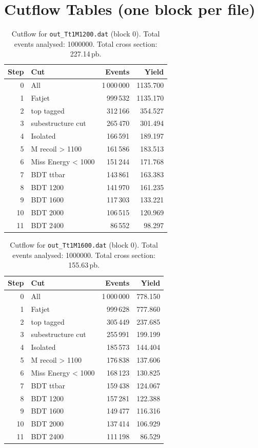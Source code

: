 \documentclass{article}
\begin{document}
\section*{Cutflow Tables (one block per file)}
\begin{table}[H]
\centering
\begin{tabular}{r l r r}
\toprule
Step & Cut & Events & Yield \\
\midrule
0 & All & 1\,000\,000 & 1135.700 \\
1 & Fatjet & 999\,532 & 1135.170 \\
2 & top tagged & 312\,166 & 354.527 \\
3 & subestructure cut & 265\,470 & 301.494 \\
4 & Isolated & 166\,591 & 189.197 \\
5 & M recoil > 1100 & 161\,586 & 183.513 \\
6 & Miss Energy < 1000 & 151\,244 & 171.768 \\
7 & BDT ttbar & 143\,861 & 163.383 \\
8 & BDT 1200 & 141\,970 & 161.235 \\
9 & BDT 1600 & 117\,303 & 133.221 \\
10 & BDT 2000 & 106\,515 & 120.969 \\
11 & BDT 2400 & 86\,552 & 98.297 \\
\bottomrule
\end{tabular}
\caption{Cutflow for \texttt{out\_Tt1M1200.dat} (block 0). Total events analysed: 1000000. Total cross section: 227.14\,pb.}
\label{tab:cutflow-out-Tt1M1200-dat}
\end{table}

\begin{table}[H]
\centering
\begin{tabular}{r l r r}
\toprule
Step & Cut & Events & Yield \\
\midrule
0 & All & 1\,000\,000 & 778.150 \\
1 & Fatjet & 999\,628 & 777.860 \\
2 & top tagged & 305\,449 & 237.685 \\
3 & subestructure cut & 255\,991 & 199.199 \\
4 & Isolated & 185\,573 & 144.404 \\
5 & M recoil > 1100 & 176\,838 & 137.606 \\
6 & Miss Energy < 1000 & 168\,123 & 130.825 \\
7 & BDT ttbar & 159\,438 & 124.067 \\
8 & BDT 1200 & 157\,281 & 122.388 \\
9 & BDT 1600 & 149\,477 & 116.316 \\
10 & BDT 2000 & 137\,414 & 106.929 \\
11 & BDT 2400 & 111\,198 & 86.529 \\
\bottomrule
\end{tabular}
\caption{Cutflow for \texttt{out\_Tt1M1600.dat} (block 0). Total events analysed: 1000000. Total cross section: 155.63\,pb.}
\label{tab:cutflow-out-Tt1M1600-dat}
\end{table}
\end{document}
